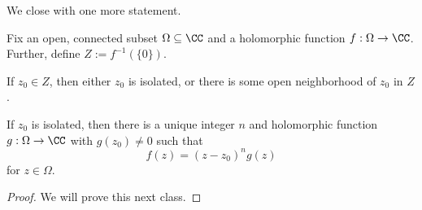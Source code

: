 We close with one more statement.
\begin{proposition}
	Fix an open, connected subset $\Omega\subseteq\CC$ and a holomorphic function $f:\Omega\to\CC$. Further, define $Z:=f^{-1}(\{0\})$.
	\begin{listalph}
		\item If $z_0\in Z$, then either $z_0$ is isolated, or there is some open neighborhood of $z_0$ in $Z$.
		\item If $z_0$ is isolated, then there is a unique integer $n$ and holomorphic function $g:\Omega\to\CC$ with $g(z_0)\ne0$ such that
		\[f(z)=(z-z_0)^ng(z)\]
		for $z\in\Omega$.
	\end{listalph}
\end{proposition}
\begin{proof}
	We will prove this next class.
\end{proof}